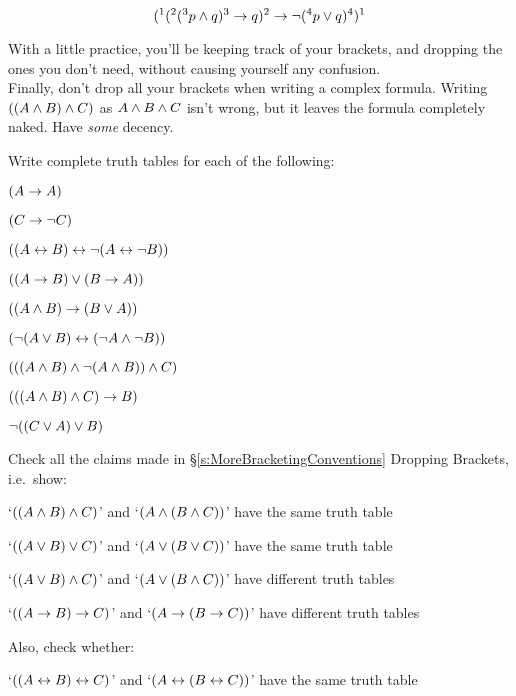 \documentclass[PHIL101-Textbook.tex]{subfiles}
\begin{document}
$$(^1(^2 (^3 p \land q)^3 \rightarrow q)^2 \to \neg (^4 p \lor q)^4)^1$$

With a little practice, you'll be keeping track of your brackets, and dropping the ones you don't need, without causing yourself any confusion.\\

Finally, don't drop all your brackets when writing a complex formula. Writing $((A \land B) \land C)$ as $A \land B \land C$ isn't wrong, but it leaves the formula completely naked. Have \emph{some} decency.


\pagebreak

\practiceproblems\label{pr.TT.TTorC}
\problempart
Write complete truth tables for each of the following:
\begin{earg}
\item $(A \rightarrow A)$ %
\item $(C \rightarrow\neg C)$ %
\item $((A \leftrightarrow B) \leftrightarrow \neg(A\leftrightarrow \neg B))$ %
\item $((A \rightarrow B) \vee (B \rightarrow A))$ %
\item $((A \land B) \rightarrow (B \vee A))$  %
\item $(\neg(A \vee B) \leftrightarrow (\neg A \land \neg B))$ %
\item $(((A\land B) \land\neg(A\land B))\land C)$ %
\item $(((A \land B) \land C) \rightarrow B)$ %
\item $\neg((C\vee A) \vee B)$ %
\end{earg}
\problempart
Check all the claims made in \S\ref{s:MoreBracketingConventions} Dropping Brackets, i.e.\ show:
\begin{earg}
	\item `$((A \land B) \land C)$' and `$(A \land (B \land C))$' have the same truth table
	\item `$((A \vee B) \vee C)$' and `$(A \vee (B \vee C))$' have the same truth table
	\item `$((A \vee B) \land C)$' and `$(A \vee (B \land C))$' have different truth tables
	\item `$((A \rightarrow B) \rightarrow C)$' and `$(A \rightarrow (B \rightarrow C))$' have different truth tables
	\item[]\hspace{-30pt}Also, check whether:
	\item `$((A \leftrightarrow B) \leftrightarrow C)$' and `$(A \leftrightarrow (B \leftrightarrow C))$' have the same truth table
\end{earg}
\end{document}
